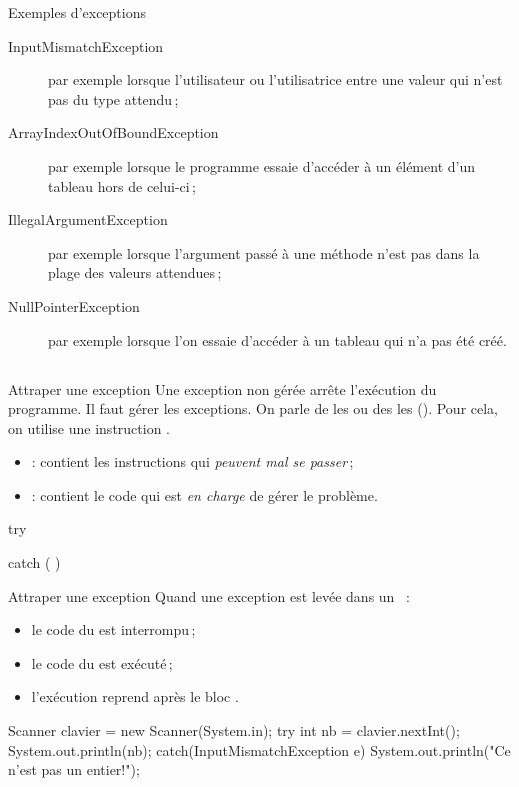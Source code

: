 \begin{frame}{Exemples d'exceptions}
\begin{description}
  \item[InputMismatchException] par exemple lorsque l'utilisateur ou
    l'utilisatrice entre une valeur qui n'est pas du type attendu\,;
  \item[ArrayIndexOutOfBoundException] par exemple lorsque le programme
    essaie d'accéder à un élément d'un tableau hors de celui-ci\,;
  \item[IllegalArgumentException] par exemple lorsque l'argument passé à
    une méthode n'est pas dans la plage des valeurs attendues\,;
  \item[NullPointerException] par exemple lorsque l'on essaie d'accéder à
    un tableau qui n'a pas été créé.
\end{description}
\end{frame}

\subsection{}
\begin{frame}[fragile]{Attraper une exception}
  Une exception non gérée arrête l'exécution du programme.
  \pause Il faut gérer les exceptions. On parle de les 
  ou des les  (\textit{}). Pour cela, on
  utilise une instruction .

  \begin{itemize}
    \item {} : contient les instructions qui \emph{peuvent mal se
      passer}\,;
    \item {} : contient le code qui est \emph{en charge} de gérer
      le problème.
  \end{itemize}

  \begin{grammaire}
    try  

    catch (  ) 
  \end{grammaire}
\end{frame}

\begin{frame}[fragile]{Attraper une exception}
  Quand une exception est levée dans un ~:
  \begin{itemize}
    \item le code du  est interrompu\,;
    \item le code du  est exécuté\,;
    \item l'exécution reprend après le bloc .
  \end{itemize}
  \begin{java}
Scanner clavier = new Scanner(System.in);
try {
    int nb = clavier.nextInt();
    System.out.println(nb);
}
catch(InputMismatchException e) {
    System.out.println("Ce n'est pas un entier!");
}
  \end{java}
\end{frame}

